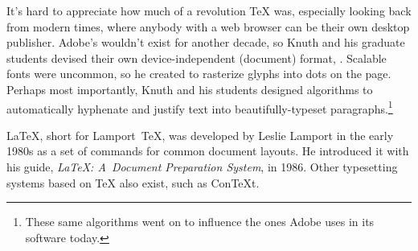 It's hard to appreciate how much of a revolution \TeX{} was,
especially looking back from modern times, where anybody with a web browser
can be their own desktop publisher.
Adobe's  wouldn't exist for another decade, so Knuth
and his graduate students devised their own device-independent (document) format,
.
Scalable fonts were uncommon, so he created \MF{} to rasterize glyphs
into dots on the page.
Perhaps most importantly, Knuth and his students designed algorithms
to automatically hyphenate and justify text into
beautifully-typeset paragraphs.\punckern\footnote{These same algorithms went
on to influence the ones Adobe uses in its software today.\punckern{}}

\LaTeX{}, short for Lamport~\TeX{}, was developed by Leslie Lamport in the
early 1980s as a set of commands for common document layouts.
He introduced it with his guide,
\textit{\LaTeX: A~Document Preparation System},
in 1986.
Other typesetting systems based on \TeX{} also exist,
such as Con\TeX{}t.

